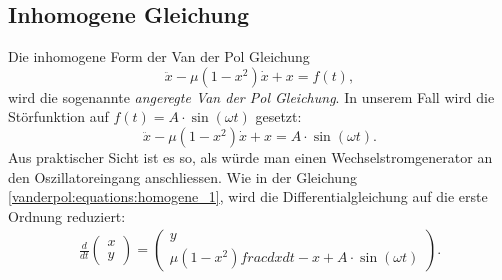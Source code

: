 \subsection{Inhomogene Gleichung}
\label{vanderpol:subsection:inhomogene}
Die inhomogene Form der Van der Pol Gleichung
\begin{equation*}
	\ddot{x}-\mu(1-x^{2}) \dot{x}+x = f(t),
\label{vanderpol:equations:inhomogene_gen}
\end{equation*}
wird die sogenannte {\em angeregte Van der Pol Gleichung}. In unserem Fall wird die Störfunktion auf $f(t) = A \cdot \sin(\omega t)$ gesetzt:
%
%
\begin{equation}
	\ddot{x}-\mu(1-x^{2}) \dot{x}+x = A \cdot \sin(\omega t).
\label{vanderpol:equations:inhomogene_sin}
\end{equation}
Aus praktischer Sicht ist es so, als würde man einen Wechselstromgenerator an den Oszillatoreingang anschliessen. Wie in der Gleichung \eqref{vanderpol:equations:homogene_1}, wird die Differentialgleichung auf die erste Ordnung reduziert:
\begin{align}
\frac{d}{dt}\begin{pmatrix}x \\ y\end{pmatrix} = \begin{pmatrix}y \\ \mu (1-x^{2})frac{dx}{dt}-x+A \cdot \sin(\omega t)\end{pmatrix}.
\label{vanderpol:equations:inhomogene_2}
\end{align}
